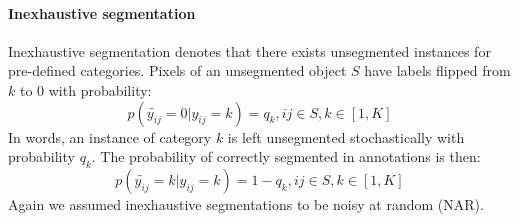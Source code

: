 \noindent
\paragraph{Inexhaustive segmentation}
Inexhaustive segmentation denotes that there exists unsegmented instances for pre-defined categories.
Pixels of an unsegmented object $S$ have labels flipped from $k$ to $0$ with probability:
$$p(\tilde{y_{ij}}=0\vert y_{ij}=k) = q_k, ij \in S, k \in [1,K]$$
In words, an instance of category $k$ is left unsegmented stochastically with probability $q_k$.
The probability of correctly segmented in annotations is then:
$$p(\tilde{y_{ij}}=k\vert y_{ij}=k) = 1-q_k, ij \in S, k \in [1,K]$$
Again we assumed inexhaustive segmentations to be noisy at random (NAR).





